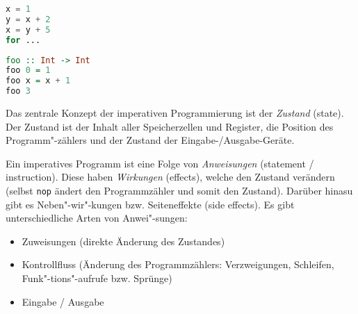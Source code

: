 \begin{lstlisting}[language=Python, caption=Imperatives Programm]
x = 1
y = x + 2
x = y + 5
for ...
\end{lstlisting}


\begin{lstlisting}[language=Haskell, caption=Funktionales Programm]
foo :: Int -> Int
foo 0 = 1
foo x = x + 1
foo 3
\end{lstlisting}

Das zentrale Konzept der imperativen Programmierung ist der \emph{Zustand} (state). Der Zustand ist der Inhalt aller Speicherzellen und Register, die Position des Programm"-zählers und der Zustand der Eingabe-/Ausgabe-Geräte.

Ein imperatives Programm ist eine Folge von \emph{Anweisungen} (statement / instruction). Diese haben \emph{Wirkungen} (effects), welche den Zustand verändern (selbst \texttt{nop} ändert den Programmzähler und somit den Zustand). Darüber hinasu gibt es Neben"-wir"-kungen bzw. Seiteneffekte (side effects). Es gibt unterschiedliche Arten von Anwei"-sungen:
\begin{itemize}
    \item Zuweisungen (direkte Änderung des Zustandes)
    \item Kontrollfluss (Änderung des Programmzählers: Verzweigungen, Schleifen, Funk"-tions"-aufrufe bzw. Sprünge)
    \item Eingabe / Ausgabe
\end{itemize}
